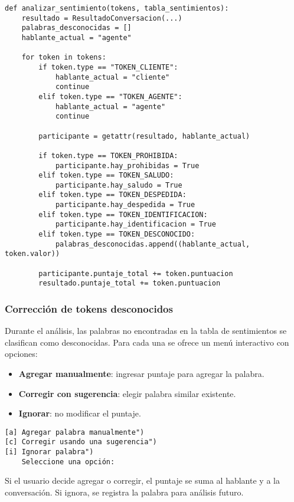 \begin{verbatim}
def analizar_sentimiento(tokens, tabla_sentimientos):
    resultado = ResultadoConversacion(...)
    palabras_desconocidas = []
    hablante_actual = "agente"

    for token in tokens:
        if token.type == "TOKEN_CLIENTE":
            hablante_actual = "cliente"
            continue
        elif token.type == "TOKEN_AGENTE":
            hablante_actual = "agente"
            continue

        participante = getattr(resultado, hablante_actual)

        if token.type == TOKEN_PROHIBIDA:
            participante.hay_prohibidas = True
        elif token.type == TOKEN_SALUDO:
            participante.hay_saludo = True
        elif token.type == TOKEN_DESPEDIDA:
            participante.hay_despedida = True
        elif token.type == TOKEN_IDENTIFICACION:
            participante.hay_identificacion = True
        elif token.type == TOKEN_DESCONOCIDO:
            palabras_desconocidas.append((hablante_actual, token.valor))

        participante.puntaje_total += token.puntuacion
        resultado.puntaje_total += token.puntuacion
\end{verbatim}

\subsubsection{Corrección de tokens desconocidos}
Durante el análisis, las palabras no encontradas en la tabla de sentimientos se clasifican como
desconocidas. Para cada una se ofrece un menú interactivo con opciones:

\begin{itemize}
	\item \textbf{Agregar manualmente}: ingresar puntaje para agregar la palabra.
	\item \textbf{Corregir con sugerencia}: elegir palabra similar existente.
	\item \textbf{Ignorar}: no modificar el puntaje.
\end{itemize}

\begin{verbatim}
[a] Agregar palabra manualmente")
[c] Corregir usando una sugerencia")
[i] Ignorar palabra")
    Seleccione una opción:
\end{verbatim}

Si el usuario decide agregar o corregir, el puntaje se suma al hablante y a la conversación. Si
ignora, se registra la palabra para análisis futuro.

